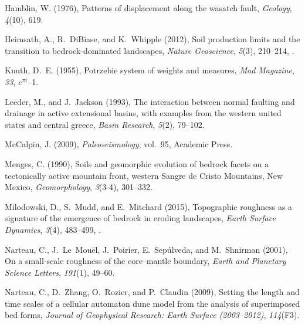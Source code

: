 \begin{thebibliography}{50}
Hamblin, W. (1976), Patterns of displacement along the wasatch fault,
  \textit{Geology}, \textit{4}(10), 619.

Heimsath, A., R.~DiBiase, and K.~Whipple (2012), Soil production limits and the
  transition to bedrock-dominated landscapes, \textit{Nature Geoscience},
  \textit{5}(3), 210--214, .

Knuth, D.~E. (1955), Potrzebie system of weights and measures, \textit{Mad
  Magazine}, \textit{33}, $e^{\pi i}$--1.

Leeder, M., and J.~Jackson (1993), The interaction between normal faulting and
  drainage in active extensional basins, with examples from the western united
  states and central greece, \textit{Basin Research}, \textit{5}(2), 79--102.

McCalpin, J. (2009), \textit{Paleoseismology}, vol.~95, Academic Press.

Menges, C. (1990), {Soils and geomorphic evolution of bedrock facets on a
  tectonically active mountain front, western Sangre de Cristo Mountains, New
  Mexico}, \textit{Geomorphology}, \textit{3}(3-4), 301--332.

Milodowski, D., S.~Mudd, and E.~Mitchard (2015), Topographic roughness as a
  signature of the emergence of bedrock in eroding landscapes, \textit{Earth
  Surface Dynamics}, \textit{3}(4), 483--499, .

Narteau, C., J.~Le~Mou{\"e}l, J.~Poirier, E.~Sep{\'u}lveda, and M.~Shnirman
  (2001), On a small-scale roughness of the core--mantle boundary,
  \textit{Earth and Planetary Science Letters}, \textit{191}(1), 49--60.

Narteau, C., D.~Zhang, O.~Rozier, and P.~Claudin (2009), Setting the length and
  time scales of a cellular automaton dune model from the analysis of
  superimposed bed forms, \textit{Journal of Geophysical Research: Earth
  Surface (2003--2012)}, \textit{114}(F3).


\end{thebibliography}
